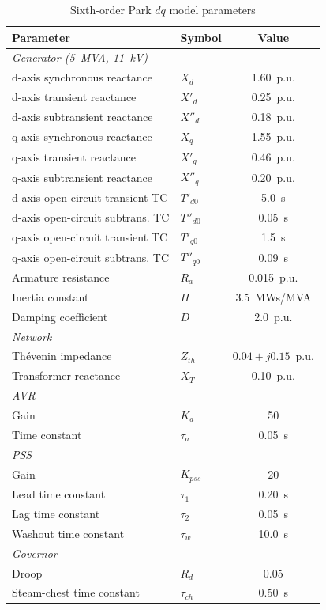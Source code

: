 \documentclass[journal,twoside,letterpaper]{IEEEtran}
\begin{document}
\begin{table}[!t]
\caption{Sixth-order Park $dq$ model parameters}
\label{tab:sixthorder_params}
\centering
\renewcommand{\arraystretch}{1.15}
\begin{tabular}{llc}
\toprule
Parameter & Symbol & Value \\
\midrule
\multicolumn{3}{l}{\textit{Generator (5~MVA, 11~kV)}} \\
d-axis synchronous reactance     & $X_d$          & 1.60~p.u. \\
d-axis transient reactance       & $X'_d$         & 0.25~p.u. \\
d-axis subtransient reactance    & $X''_d$        & 0.18~p.u. \\
q-axis synchronous reactance     & $X_q$          & 1.55~p.u. \\
q-axis transient reactance       & $X'_q$         & 0.46~p.u. \\
q-axis subtransient reactance    & $X''_q$        & 0.20~p.u. \\
d-axis open-circuit transient TC & $T'_{d0}$      & 5.0~s \\
d-axis open-circuit subtrans. TC & $T''_{d0}$     & 0.05~s \\
q-axis open-circuit transient TC & $T'_{q0}$      & 1.5~s \\
q-axis open-circuit subtrans. TC & $T''_{q0}$     & 0.09~s \\
Armature resistance              & $R_a$          & 0.015~p.u. \\
Inertia constant                 & $H$            & 3.5~MWs/MVA \\
Damping coefficient              & $D$            & 2.0~p.u. \\
\midrule
\multicolumn{3}{l}{\textit{Network}} \\
Thévenin impedance               & $Z_{th}$       & $0.04+j0.15$~p.u. \\
Transformer reactance            & $X_T$          & 0.10~p.u. \\
\midrule
\multicolumn{3}{l}{\textit{AVR}} \\
Gain                             & $K_a$          & 50 \\
Time constant                    & $\tau_a$       & 0.05~s \\
\midrule
\multicolumn{3}{l}{\textit{PSS}} \\
Gain                             & $K_{pss}$      & 20 \\
Lead time constant               & $\tau_1$       & 0.20~s \\
Lag time constant                & $\tau_2$       & 0.05~s \\
Washout time constant            & $\tau_w$       & 10.0~s \\
\midrule
\multicolumn{3}{l}{\textit{Governor}} \\
Droop                            & $R_d$          & 0.05 \\
Steam-chest time constant        & $\tau_{ch}$    & 0.50~s \\
\bottomrule
\end{tabular}
\end{table}
\end{document}
